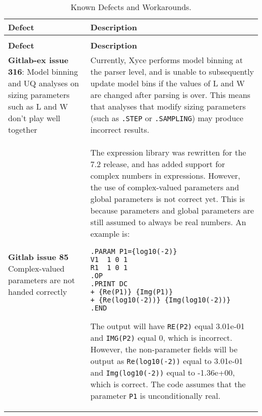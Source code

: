 {
\small

\begin{longtable}[h] {>{\raggedright\small}m{2in}|>{\raggedright\let\\\tabularnewline\small}m{3.5in}}
  \caption{Known Defects and Workarounds.} \\ \hline
  \rowcolor{XyceDarkBlue} \color{white}\textbf{Defect} & \color{white}\textbf{Description} \\ \hline \endfirsthead
  \caption[]{Known Defects and Workarounds.} \\ \hline
  \rowcolor{XyceDarkBlue} \color{white}\textbf{Defect} & \color{white}\textbf{Description}
  \\ \hline \endhead

%
%

\textbf{Gitlab-ex issue 316}: Model binning and UQ analyses on sizing parameters such as L 
  and W don't play well together &  Currently, Xyce performs model binning at the parser level, and is unable to subsequently update model bins if the values of L and W are changed after parsing is over.  This means that analyses that modify sizing parameters (such as \texttt{.STEP} or \texttt{.SAMPLING}) may produce incorrect results.
\\ \hline

\textbf{Gitlab issue 85} Complex-valued parameters are not handed correctly &
The \Xyce{} expression library was rewritten for the 7.2 release, and
has added support for complex numbers in expressions.  However, the
use of complex-valued parameters and global parameters is not correct yet. 
This is because parameters and global parameters are still assumed to
always be real numbers.
An example is:
\begin{verbatim}
.PARAM P1={log10(-2)}
V1  1 0 1
R1  1 0 1
.OP
.PRINT DC 
+ {Re(P1)} {Img(P1)} 
+ {Re(log10(-2))} {Img(log10(-2))}
.END
\end{verbatim}
The output will have \texttt{RE(P2)} equal 3.01e-01 and \texttt{IMG(P2)}
  equal 0, which is incorrect.  However,  the non-parameter fields will be
  output as \texttt{Re(log10(-2))} equal to
  3.01e-01 and \texttt{Img(log10(-2))} equal to -1.36e+00, which is correct.
  The code assumes that the parameter \texttt{P1} is unconditionally real.
\\ \hline


\end{longtable}}
